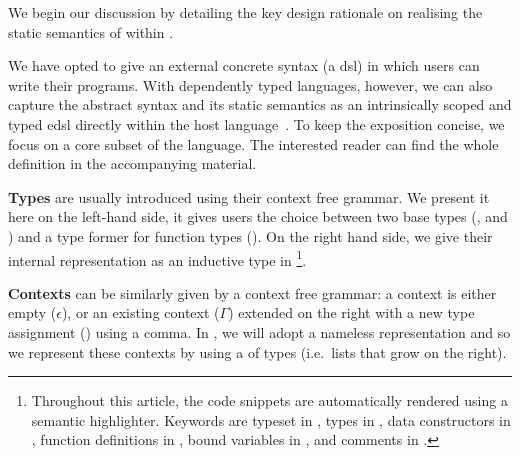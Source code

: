 We begin our discussion by detailing the key design rationale on
realising the static semantics of \Velo{} within \Idris{}.

We have opted to give \Velo{} an external concrete syntax (a \ac{dsl})
in which users can write their programs.
%
With dependently typed languages, however, we can also capture
the abstract syntax and its static semantics as an intrinsically
scoped and typed \ac{edsl}
directly within the host language~\cite{Augustsson1999edt}.
%
To keep the exposition concise, we focus on a core subset of the
language. The interested reader can find the whole definition
in the accompanying material.

\textbf{Types} are usually introduced using their context free grammar.
%
We present it here on the left-hand side, it gives users the choice between
two base types (\TyNat, and \TyBool) and a type former for function types
(\TyFunc{\cdot}{\cdot}).
%
On the right hand side, we give their internal representation as an inductive
type in \Idris{}
\footnote{
Throughout this article, the \Idris{} code snippets are
automatically rendered using a semantic highlighter.
%
Keywords are typeset in ,
types in ,
data constructors in ,
function definitions in ,
bound variables in ,
and comments in .
}.

\begin{center}
\begin{minipage}{0.45\textwidth}
\syntaxtypes
\end{minipage}\hfill
\begin{minipage}{0.45\textwidth}
\end{minipage}
\end{center}

\textbf{Contexts} can be similarly given by a context free grammar:
a context is either empty ($\epsilon$), or an existing context ($\Gamma$)
extended on the right with a new type assignment () using a comma.
%
In \Idris{}, we will adopt a nameless representation and so we represent
these contexts by using a  of types
(i.e.\ lists that grow on the right).


\begin{center}
\begin{minipage}{0.35\textwidth}
\syntaxcontexts
\end{minipage}\hfill
\begin{minipage}{0.55\textwidth}
\end{minipage}
\end{center}

